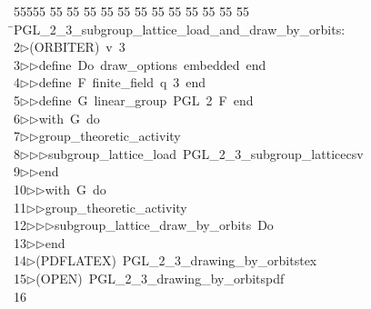 %
%
\begin{tabbing}
55555 \= 55 \= 55 \= 55 \= 55 \= 55 \= 55 \= 55 \= 55 \= 55 \= 55 \= 55 \= 55 \= \>PGL\_2\_3\_subgroup\_lattice\_load\_and\_draw\_by\_orbits:\\[0pt]
2\>$\triangleright$\>(ORBITER)\ v\ 3\ \\[0pt]
3\>$\triangleright$\>$\triangleright$\>define\ Do\ draw\_options\ embedded\ end\ \\[0pt]
4\>$\triangleright$\>$\triangleright$\>define\ F\ finite\_field\ q\ 3\ end\ \\[0pt]
5\>$\triangleright$\>$\triangleright$\>define\ G\ linear\_group\ PGL\ 2\ F\ end\ \\[0pt]
6\>$\triangleright$\>$\triangleright$\>with\ G\ do\ \\[0pt]
7\>$\triangleright$\>$\triangleright$\>group\_theoretic\_activity\ \\[0pt]
8\>$\triangleright$\>$\triangleright$\>$\triangleright$\>subgroup\_lattice\_load\ PGL\_2\_3\_subgroup\_latticecsv\ \\[0pt]
9\>$\triangleright$\>$\triangleright$\>end\ \\[0pt]
10\>$\triangleright$\>$\triangleright$\>with\ G\ do\ \\[0pt]
11\>$\triangleright$\>$\triangleright$\>group\_theoretic\_activity\ \\[0pt]
12\>$\triangleright$\>$\triangleright$\>$\triangleright$\>subgroup\_lattice\_draw\_by\_orbits\ Do\ \\[0pt]
13\>$\triangleright$\>$\triangleright$\>end\\[0pt]
14\>$\triangleright$\>(PDFLATEX)\ PGL\_2\_3\_drawing\_by\_orbitstex\\[0pt]
15\>$\triangleright$\>(OPEN)\ PGL\_2\_3\_drawing\_by\_orbitspdf\\[0pt]
16\>\end{tabbing}

